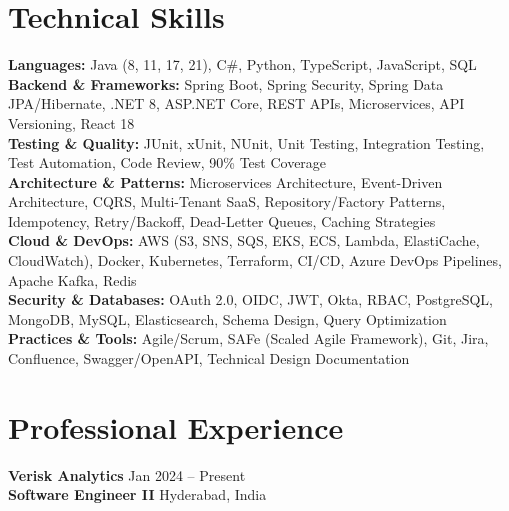 \documentclass[a4paper,10pt]{article}
\begin{document}
\section*{Technical Skills}
\begin{sloppypar}
\noindent
\textbf{Languages:} Java (8, 11, 17, 21), C\#, Python, TypeScript, JavaScript, SQL \\
\textbf{Backend \& Frameworks:} Spring Boot, Spring Security, Spring Data JPA/Hibernate, .NET 8, ASP.NET Core, REST APIs, Microservices, API Versioning, React 18 \\
\textbf{Testing \& Quality:} JUnit, xUnit, NUnit, Unit Testing, Integration Testing, Test Automation, Code Review, 90\% Test Coverage \\
\textbf{Architecture \& Patterns:} Microservices Architecture, Event-Driven Architecture, CQRS, Multi-Tenant SaaS, Repository/Factory Patterns, Idempotency, Retry/Backoff, Dead-Letter Queues, Caching Strategies \\
\textbf{Cloud \& DevOps:} AWS (S3, SNS, SQS, EKS, ECS, Lambda, ElastiCache, CloudWatch), Docker, Kubernetes, Terraform, CI/CD, Azure DevOps Pipelines, Apache Kafka, Redis \\
\textbf{Security \& Databases:} OAuth 2.0, OIDC, JWT, Okta, RBAC, PostgreSQL, MongoDB, MySQL, Elasticsearch, Schema Design, Query Optimization \\
\textbf{Practices \& Tools:} Agile/Scrum, SAFe (Scaled Agile Framework), Git, Jira, Confluence, Swagger/OpenAPI, Technical Design Documentation
\end{sloppypar}

\section*{Professional Experience}

\textbf{Verisk Analytics} \hfill Jan 2024 -- Present \\
\textbf{Software Engineer II} \hfill Hyderabad, India
\end{document}
